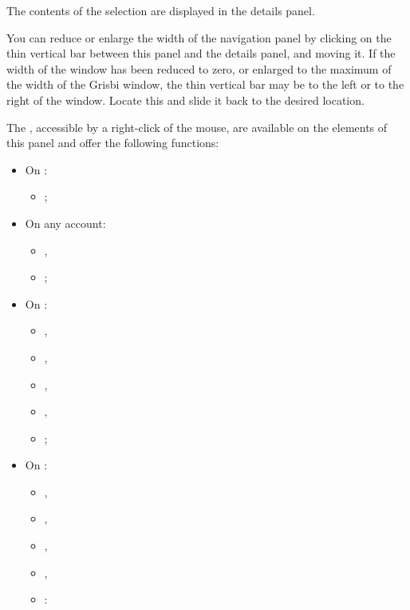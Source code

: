 The contents of the selection are displayed in the details panel.

You can reduce or enlarge the width of the navigation panel by clicking on the thin vertical bar between this panel and the details panel, and moving it. If the width of the window has been reduced to zero, or enlarged to the maximum of the width of the Grisbi window, the thin vertical bar may be to the left or to the right of the window.  Locate this and slide it back to the desired location.


The , accessible by a right-click of the mouse, are available on the elements of this panel and offer the following functions:

\begin{itemize}
	\item On :
		\begin{itemize}
			\item {};
		\end{itemize}
	\item On any account: 
		\begin{itemize}
			\item {},
			\item {};
		\end{itemize}
	\item On :
		\begin{itemize}
			\item {},
			\item {},
			\item {},
			\item {},
			\item {};
		\end{itemize}
	\item On : 
		\begin{itemize}
			\item {},
			\item {},
			\item {},
			\item {},
			\item {}:
		\end{itemize}

\end{itemize}
